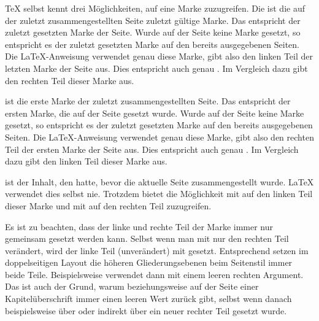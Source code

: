   \TeX{} selbst kennt drei Möglichkeiten, auf eine Marke zuzugreifen. Die
   ist die auf der
  zuletzt zusammengestellten Seite zuletzt gültige Marke. Das entspricht der
  zuletzt gesetzten Marke der Seite. Wurde auf der Seite keine Marke gesetzt,
  so entspricht es der zuletzt gesetzten Marke auf den bereits ausgegebenen
  Seiten. Die \LaTeX-Anweisung  verwendet genau
  diese Marke, gibt also den linken Teil der letzten Marke der Seite aus. Dies
  entspricht auch genau . Im
  Vergleich dazu gibt  den
  rechten Teil dieser Marke aus.

   ist die
  erste Marke der zuletzt zusammengestellten Seite. Das entspricht der ersten
  Marke, die auf der Seite gesetzt wurde. Wurde auf der Seite keine Marke
  gesetzt, so entspricht es der zuletzt gesetzten Marke auf den bereits
  ausgegebenen Seiten. Die \LaTeX-Anweisung 
  verwendet genau diese Marke, gibt also den rechten Teil der ersten Marke der
  Seite aus. Dies entspricht auch genau
  . Im Vergleich dazu
  gibt  den linken Teil
  dieser Marke aus.

   ist der Inhalt,
  den  hatte, bevor die aktuelle Seite zusammengestellt
  wurde. \LaTeX{} verwendet dies selbst nie. Trotzdem bietet
   die Möglichkeit mit  auf
  den linken Teil dieser Marke und mit
   auf den rechten Teil
  zuzugreifen.

  Es ist zu beachten, dass der linke und rechte Teil der
  Marke immer nur gemeinsam gesetzt werden kann. Selbst wenn man mit
   nur den rechten Teil
  verändert, wird der linke Teil (unverändert) mit gesetzt. Entsprechend
  setzen im doppelseitigen Layout die höheren Gliederungsebenen beim
  Seitenstil
  immer beide Teile. Beispielsweise verwendet
   dann
   mit einem leeren rechten Argument. Das ist
  auch der Grund, warum  beziehungsweise
   auf der Seite einer Kapitelüberschrift immer einen
  leeren Wert zurück gibt, selbst wenn danach beispielsweise über
   oder indirekt über
   ein neuer rechter Teil
   gesetzt
  wurde.


